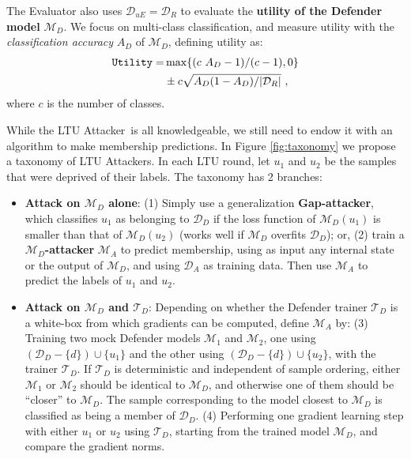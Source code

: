 \documentclass[letterpaper]{article}
\newcommand{\sminus}{-}
\newcommand{\oracle}{LTU Attacker~}
\begin{document}
The Evaluator also uses $\mathcal{D}_{uE} = \mathcal{D}_R$ to evaluate the {\bf utility of the Defender model} $\mathcal{M}_D$. We focus on multi-class classification, and measure utility with the {\em classification accuracy} $A_D$ of $\mathcal{M}_D$, defining utility as:
\begin{align}
\texttt{Utility} = & \max\{(c~A_D - 1)/(c-1), 0\} \notag \\
& \pm c \sqrt{A_D(1-A_D)/|\mathcal{D}_{R}|}~,
\label{equation:utility}
\end{align}
where $c$ is the number of classes.

While the \oracle is all knowledgeable, we still need to endow it with an algorithm to make membership predictions. In Figure \ref{fig:taxonomy} we propose a taxonomy of LTU Attackers.
In each LTU round, let $u_1$ and $u_2$ be the samples that were deprived of their labels. The taxonomy has 2 branches:
\begin{itemize}
\item {\bf  Attack on $\mathcal{M}_D$ alone}: (1) Simply use a generalization {\bf Gap-attacker}, which classifies $u_1$ as belonging to $\mathcal{D}_D$ if the loss function of $\mathcal{M}_D(u_1)$ is smaller than that of  $\mathcal{M}_D(u_2)$ (works well if  $\mathcal{M}_D$ overfits $\mathcal{D}_D$); or,
(2) train a {\bf $\mathcal{M}_D$-attacker} $\mathcal{M}_A$ to predict membership, using as input any internal state or the output of $\mathcal{M}_D$, and using $\mathcal{D}_A$ as training data. Then use $\mathcal{M}_A$ to predict the labels of $u_1$ and $u_2$.

\item {\bf  Attack on $\mathcal{M}_D$ and $\mathcal{T}_D$}: Depending on whether the Defender trainer $\mathcal{T}_D$ is a white-box from which gradients can be computed, define  $\mathcal{M}_A$ by: (3) Training two mock Defender models $\mathcal{M}_1$ and $\mathcal{M}_2$, one using $(\mathcal{D}_D\sminus\{d\})\cup \{u_1\}$ and the other using $(\mathcal{D}_D\sminus\{d\})\cup \{u_2\}$, with the trainer $\mathcal{T}_D$. If $\mathcal{T}_D$ is deterministic and independent of sample ordering, either $\mathcal{M}_1$ or $\mathcal{M}_2$ should be identical to $\mathcal{M}_D$, and otherwise one of them should be ``closer'' to $\mathcal{M}_D$. The sample corresponding to the model closest to $\mathcal{M}_D$ is classified as being a member of $\mathcal{D}_D$. (4) Performing one gradient learning step with either $u_1$ or $u_2$ using $\mathcal{T}_D$, starting from the trained model $\mathcal{M}_D$, and compare the gradient norms.
\end{itemize}
\end{document}
